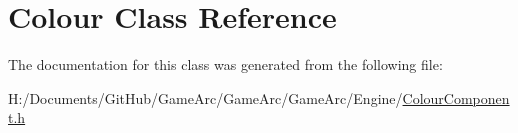 \hypertarget{class_colour}{\section{Colour Class Reference}
\label{class_colour}
}


The documentation for this class was generated from the following file\+:\begin{DoxyCompactItemize}
\item 
H\+:/\+Documents/\+Git\+Hub/\+Game\+Arc/\+Game\+Arc/\+Game\+Arc/\+Engine/\hyperlink{_colour_component_8h}{Colour\+Component.\+h}\end{DoxyCompactItemize}
